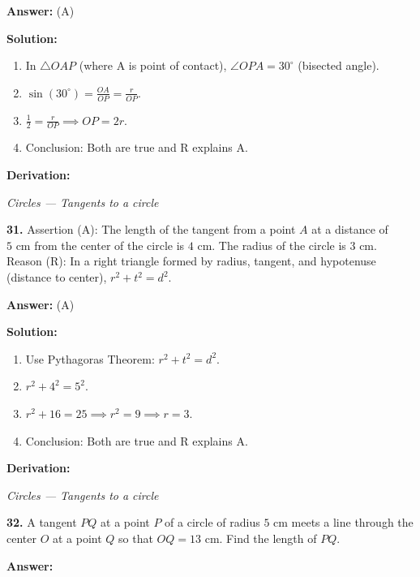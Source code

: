 \documentclass[12pt,a4paper]{exam}
\newcommand{\fitmath}[1]{%
  \sbox{\schmathbox}{$\displaystyle #1$}%
  \ifdim\wd\schmathbox>\linewidth
    \resizebox{\linewidth}{!}{\usebox{\schmathbox}}%
  \else
    \usebox{\schmathbox}%
  \fi}
\begin{document}
\begin{questions}
\textbf{Answer:}
(A)

\textbf{Solution:}
\begin{enumerate}
  \item In $\triangle OAP$ (where A is point of contact), $\angle OPA = 30^\circ$ (bisected angle).
  \item $\sin(30^\circ) = \frac{OA}{OP} = \frac{r}{OP}$.
  \item $\frac{1}{2} = \frac{r}{OP} \implies OP = 2r$.
  \item Conclusion: Both are true and R explains A.
\end{enumerate}
\textbf{Derivation:}
\begin{center}
\fitmath{\begin{aligned}
\sin(30^\circ) = \frac{r}{OP} \\
\implies OP = 2r
\end{aligned}}
\end{center}
\hfill \textit{Circles — Tangents to a circle}
\vspace{0.3cm}

\question \textbf{31.} Assertion (A): The length of the tangent from a point $A$ at a distance of $5 \text{ cm}$ from the center of the circle is $4 \text{ cm}$. The radius of the circle is $3 \text{ cm}$. Reason (R): In a right triangle formed by radius, tangent, and hypotenuse (distance to center), $r^2 + t^2 = d^2$.

\textbf{Answer:}
(A)

\textbf{Solution:}
\begin{enumerate}
  \item Use Pythagoras Theorem: $r^2 + t^2 = d^2$.
  \item $r^2 + 4^2 = 5^2$.
  \item $r^2 + 16 = 25 \implies r^2 = 9 \implies r = 3$.
  \item Conclusion: Both are true and R explains A.
\end{enumerate}
\textbf{Derivation:}
\begin{center}
\fitmath{3^2 + 4^2 = 9 + 16 = 25 = 5^2}
\end{center}
\hfill \textit{Circles — Tangents to a circle}
\vspace{0.3cm}

\question \textbf{32.} A tangent $PQ$ at a point $P$ of a circle of radius $5$ cm meets a line through the center $O$ at a point $Q$ so that $OQ = 13$ cm. Find the length of $PQ$.

\textbf{Answer:}
\begin{center}
\fitmath{12 cm}
\end{center}


\end{questions}
\end{document}
